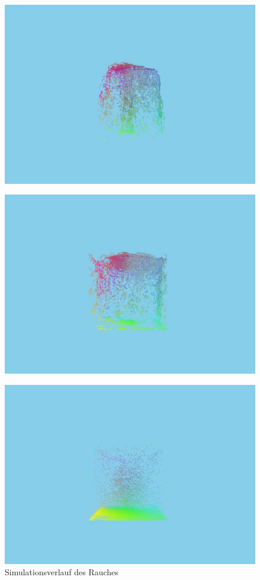 \documentclass[intern,palatino]{cgBA}
\begin{document}
\begin{figure}[H]
	\centering
	\includegraphics[width=1\columnwidth]{Bilder/4.jpg}
\end{figure}
\begin{figure}[H]
	\centering
	\includegraphics[width=1\columnwidth]{Bilder/5.jpg}
\end{figure}
\begin{figure}[H]
	\centering
	\includegraphics[width=1\columnwidth]{Bilder/6.jpg}
	\caption{Simulationsverlauf des Rauches}
\end{figure}
\end{document}
